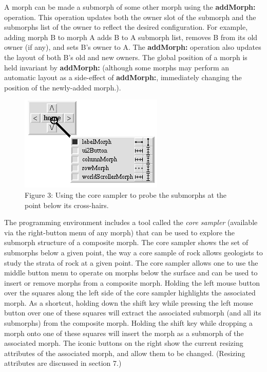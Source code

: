 \documentclass[letterpaper,10pt,english]{sphinxmanual}
\begin{document}
A morph can be made a submorph of some other morph using the \textbf{addMorph:} operation. This operation updates both the owner slot of the submorph and the submorphs list of the owner to reflect the desired configuration. For example, adding morph B to morph A adds B to A submorph list, removes B from its old owner (if any), and sets B's owner to A. The \textbf{addMorph:} operation also updates the layout of both B's old and new owners. The global position of a morph is held invariant by \textbf{addMorph:} (although some morphs may perform an automatic layout as a side-effect of \textbf{addMorph:}, immediately changing the position of the newly-added morph.).
\begin{figure}[htbp]\begin{flushleft}
\capstart

\includegraphics{Figure3.png}
\caption{Figure 3: Using the core sampler to probe the submorphs at the point below its cross-hairs.}\end{flushleft}\end{figure}

The programming environment includes a tool called the \emph{core sampler} (available via the right-button menu of any morph) that can be used to explore the submorph structure of a composite morph. The core sampler shows the set of submorphs below a given point, the way a core sample of rock allows geologists to study the strata of rock at a given point. The core sampler allows one to use the middle button menu to operate on morphs below the surface and can be used to insert or remove morphs from a composite morph. Holding the left mouse button over the squares along the left side of the core sampler highlights the associated morph. As a shortcut, holding down the shift key while pressing the left mouse button over one of these squares will extract the associated submorph (and all its submorphs) from the composite morph. Holding the shift key while dropping a morph onto one of these squares will insert the morph as a submorph of the associated morph. The iconic buttons on the right show the current resizing attributes of the associated morph, and allow them to be changed. (Resizing attributes are discussed in section 7.)
\end{document}
